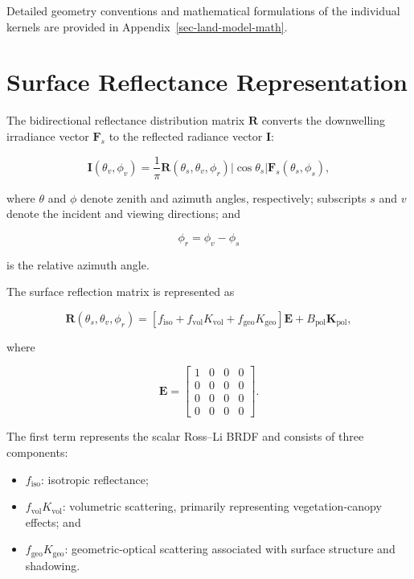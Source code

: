 \documentclass[
  11pt,
  letterpaper,
]{scrreprt}
\providecommand{\tightlist}{%
  \setlength{\itemsep}{0pt}\setlength{\parskip}{0pt}}
\begin{document}
Detailed geometry conventions and mathematical formulations of the
individual kernels are provided in Appendix~\ref{sec-land-model-math}.

\section{Surface Reflectance
Representation}\label{surface-reflectance-representation}

The bidirectional reflectance distribution matrix \(\mathbf{R}\)
converts the downwelling irradiance vector \(\mathbf{F}_s\) to the
reflected radiance vector \(\mathbf{I}\):

\[
\mathbf{I}(\theta_v,\phi_v)
=
\frac{1}{\pi}
\mathbf{R}(\theta_s,\theta_v,\phi_r)
|\cos\theta_s|
\mathbf{F}_s(\theta_s,\phi_s),
\]

where \(\theta\) and \(\phi\) denote zenith and azimuth angles,
respectively; subscripts \(s\) and \(v\) denote the incident and viewing
directions; and

\[
\phi_r = \phi_v-\phi_s
\]

is the relative azimuth angle.

The surface reflection matrix is represented as

\[
\mathbf{R}(\theta_s,\theta_v,\phi_r)
=
\left[
f_{\mathrm{iso}}
+
f_{\mathrm{vol}}K_{\mathrm{vol}}
+
f_{\mathrm{geo}}K_{\mathrm{geo}}
\right]\mathbf{E}
+
B_{\mathrm{pol}}\mathbf{K}_{\mathrm{pol}},
\]

where

\[
\mathbf{E}
=
\begin{bmatrix}
1 & 0 & 0 & 0 \\
0 & 0 & 0 & 0 \\
0 & 0 & 0 & 0 \\
0 & 0 & 0 & 0
\end{bmatrix}.
\]

The first term represents the scalar Ross--Li BRDF and consists of three
components:

\begin{itemize}
\tightlist
\item
  \(f_{\mathrm{iso}}\): isotropic reflectance;
\item
  \(f_{\mathrm{vol}}K_{\mathrm{vol}}\): volumetric scattering, primarily
  representing vegetation-canopy effects; and
\item
  \(f_{\mathrm{geo}}K_{\mathrm{geo}}\): geometric-optical scattering
  associated with surface structure and shadowing.
\end{itemize}
\end{document}
